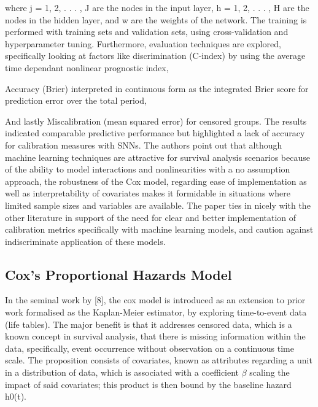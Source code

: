 where j = 1, 2, . . . , J are the nodes in the input layer, h = 1, 2, . . . ,
H are the nodes in the hidden layer, and w are the weights of the network. The
training is performed with training sets and validation sets, using cross-validation and
hyperparameter tuning. Furthermore, evaluation techniques are explored, specifically
looking at factors like discrimination (C-index) by using the average time dependant
nonlinear prognostic index,


Accuracy (Brier) interpreted in continuous form as the integrated Brier score for prediction error over the total period,


And lastly Miscalibration (mean squared error) for censored groups. The results indicated comparable predictive performance but highlighted a lack of accuracy for calibration measures with SNNs. The authors point out that although machine learning techniques are attractive for survival analysis scenarios because of the ability to model interactions and nonlinearities with a no assumption approach, the robustness of the Cox model, regarding ease of implementation as well as interpretability of covariates makes it formidable in situations where limited sample sizes and variables are available. The paper ties in nicely with the other literature in support of the need for clear and better implementation of calibration metrics specifically with machine learning models, and caution against indiscriminate application of these models.

\subsection{Cox's Proportional Hazards Model}

\noindent
In the seminal work by [8], the cox model is introduced as an extension to prior work formalised as the Kaplan-Meier estimator, by exploring time-to-event data (life tables). The major benefit is that it addresses censored data, which is a known concept in survival analysis, that there is missing information within the data, specifically, event occurrence without observation on a continuous time scale. The proposition consists of covariates, known as attributes regarding a unit in a distribution of data, which is associated with a coefficient \(\beta\) scaling the impact of said covariates; this product is then bound by the baseline hazard h0(t).


